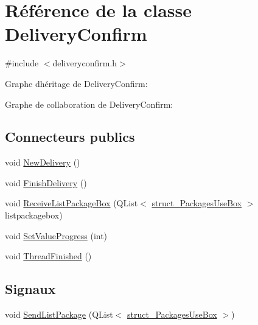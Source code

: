 \hypertarget{class_delivery_confirm}{}\section{Référence de la classe Delivery\+Confirm}
\label{class_delivery_confirm}


{\ttfamily \#include $<$deliveryconfirm.\+h$>$}



Graphe d\textquotesingle{}héritage de Delivery\+Confirm\+:


Graphe de collaboration de Delivery\+Confirm\+:
\subsection*{Connecteurs publics}
\begin{DoxyCompactItemize}
\item 
void \hyperlink{class_delivery_confirm_aedf9ca93a85b463d9e945074ba25a6c2}{New\+Delivery} ()
\item 
void \hyperlink{class_delivery_confirm_a624cfb7856fa7fc6d09558306b059958}{Finish\+Delivery} ()
\item 
void \hyperlink{class_delivery_confirm_ab257c15bc440c22e8e256c2beb791a71}{Receive\+List\+Package\+Box} (Q\+List$<$ \hyperlink{structstruct___packages_use_box}{struct\+\_\+\+Packages\+Use\+Box} $>$ listpackagebox)
\item 
void \hyperlink{class_delivery_confirm_a3dc78594f1bef55246c31cbcf56dd8fb}{Set\+Value\+Progress} (int)
\item 
void \hyperlink{class_delivery_confirm_a786adf160dbbbf94750c4502d67ef81c}{Thread\+Finished} ()
\end{DoxyCompactItemize}
\subsection*{Signaux}
\begin{DoxyCompactItemize}
\item 
void \hyperlink{class_delivery_confirm_a7d8f426b5cd846f420e11d45a00573f2}{Send\+List\+Package} (Q\+List$<$ \hyperlink{structstruct___packages_use_box}{struct\+\_\+\+Packages\+Use\+Box} $>$)
\end{DoxyCompactItemize}
